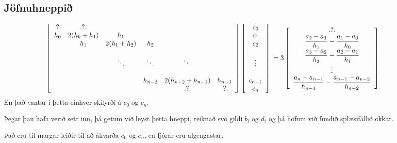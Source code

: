 \documentclass[letterpaper,10pt,icelandic]{sphinxmanual}
\begin{document}
\subsection{Jöfnuhneppið}
\label{kafli03:jofnuhneppi}\label{kafli03:jofnuhneppi}\[
\left[ \begin{array}{cccccc}
.\text{?}.  & .\text{?}.       &&&& \\ 
h_0 & 2(h_0+h_1) & h_1 &&&\\
& h_1        & 2(h_1+h_2) & h_2 &&\\
&&&&&\\
&            & \ddots      & \ddots & \ddots &\\
&&&&&\\
&  &  & h_{n-2}  & 2(h_{n-2} + h_{n-1}) & h_{n-1}
\\ 
&  &  &   & .?.    & .?.
\end{array} \right]
\left[ \begin{array}{c}
c_0 \\ 
c_1 \\
c_2 \\
\\
\vdots \\
\\
c_{n-1} \\ 
c_n
\end{array} \right]
\\
= 3\left[ \begin{array}{c}
.?. \\
\dfrac{a_2-a_1}{h_1} - \dfrac{a_1-a_0}{h_0} \\
\dfrac{a_3-a_2}{h_2} - \dfrac{a_2-a_1}{h_1} \\
\vdots \\
\dfrac{a_n-a_{n-1}}{h_{n-1}}
- \dfrac{a_{n-1}-a_{n-2}}{h_{n-2}}
\\ 
\end{array} \right]\]
En það vantar í þetta einhver skilyrði á \(c_0\) og \(c_n\).

Þegar þau hafa verið sett inn, þá getum við leyst þetta hneppi, reiknað svo
gildi \(b_i\) og \(d_i\) og þá höfum við fundið splæsifallið
okkar.

Það eru til margar leiðir til að ákvarða \(c_0\) og \(c_n\), en
fjórar eru algengastar.
\end{document}
